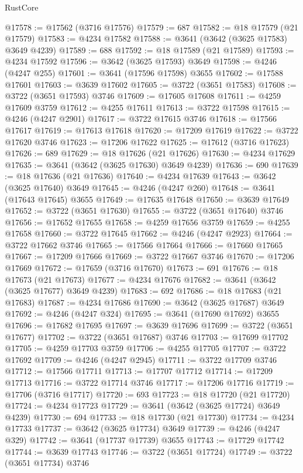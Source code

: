 \begin{lexlean}{RustCore}
\begin{coremodule}
@17578 := @17562 (@3716 @17576)
@17579 := 687
@17582 := @18 @17579 (@21 @17579)
@17583 := @4234 @17582
@17588 := @3641 (@3642 (@3625 @17583) @3649 @4239)
@17589 := 688
@17592 := @18 @17589 (@21 @17589)
@17593 := @4234 @17592
@17596 := @3642 (@3625 @17593) @3649
@17598 := @4246 (@4247 @255)
@17601 := @3641 (@17596 @17598) @3655
@17602 := @17588 @17601
@17603 := @3639 @17602
@17605 := @3722 (@3651 @17583)
@17608 := @3722 (@3651 @17593) @3746
@17609 := @17605 @17608
@17611 := @4259 @17609 @3759
@17612 := @4255 @17611
@17613 := @3722 @17598
@17615 := @4246 (@4247 @2901)
@17617 := @3722 @17615 @3746
@17618 := @17566 @17617
@17619 := @17613 @17618
@17620 := @17209 @17619
@17622 := @3722 @17620 @3746
@17623 := @17206 @17622
@17625 := @17612 (@3716 @17623)
@17626 := 689
@17629 := @18 @17626 (@21 @17626)
@17630 := @4234 @17629
@17635 := @3641 (@3642 (@3625 @17630) @3649 @4239)
@17636 := 690
@17639 := @18 @17636 (@21 @17636)
@17640 := @4234 @17639
@17643 := @3642 (@3625 @17640) @3649
@17645 := @4246 (@4247 @260)
@17648 := @3641 (@17643 @17645) @3655
@17649 := @17635 @17648
@17650 := @3639 @17649
@17652 := @3722 (@3651 @17630)
@17655 := @3722 (@3651 @17640) @3746
@17656 := @17652 @17655
@17658 := @4259 @17656 @3759
@17659 := @4255 @17658
@17660 := @3722 @17645
@17662 := @4246 (@4247 @2923)
@17664 := @3722 @17662 @3746
@17665 := @17566 @17664
@17666 := @17660 @17665
@17667 := @17209 @17666
@17669 := @3722 @17667 @3746
@17670 := @17206 @17669
@17672 := @17659 (@3716 @17670)
@17673 := 691
@17676 := @18 @17673 (@21 @17673)
@17677 := @4234 @17676
@17682 := @3641 (@3642 (@3625 @17677) @3649 @4239)
@17683 := 692
@17686 := @18 @17683 (@21 @17683)
@17687 := @4234 @17686
@17690 := @3642 (@3625 @17687) @3649
@17692 := @4246 (@4247 @324)
@17695 := @3641 (@17690 @17692) @3655
@17696 := @17682 @17695
@17697 := @3639 @17696
@17699 := @3722 (@3651 @17677)
@17702 := @3722 (@3651 @17687) @3746
@17703 := @17699 @17702
@17705 := @4259 @17703 @3759
@17706 := @4255 @17705
@17707 := @3722 @17692
@17709 := @4246 (@4247 @2945)
@17711 := @3722 @17709 @3746
@17712 := @17566 @17711
@17713 := @17707 @17712
@17714 := @17209 @17713
@17716 := @3722 @17714 @3746
@17717 := @17206 @17716
@17719 := @17706 (@3716 @17717)
@17720 := 693
@17723 := @18 @17720 (@21 @17720)
@17724 := @4234 @17723
@17729 := @3641 (@3642 (@3625 @17724) @3649 @4239)
@17730 := 694
@17733 := @18 @17730 (@21 @17730)
@17734 := @4234 @17733
@17737 := @3642 (@3625 @17734) @3649
@17739 := @4246 (@4247 @329)
@17742 := @3641 (@17737 @17739) @3655
@17743 := @17729 @17742
@17744 := @3639 @17743
@17746 := @3722 (@3651 @17724)
@17749 := @3722 (@3651 @17734) @3746

\end{coremodule}
\end{lexlean}
